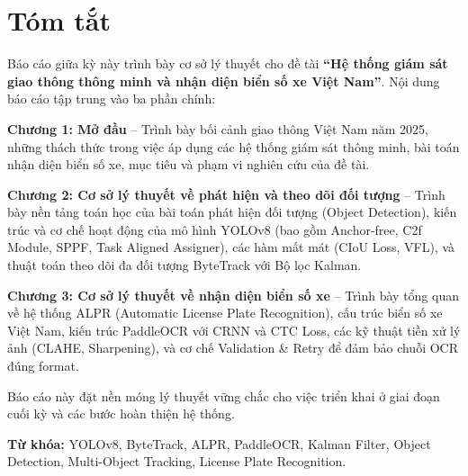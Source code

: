 \chapter*{Tóm tắt}

Báo cáo giữa kỳ này trình bày cơ sở lý thuyết cho đề tài \textbf{``Hệ thống giám sát giao thông thông minh và nhận diện biển số xe Việt Nam''}. Nội dung báo cáo tập trung vào ba phần chính:

\textbf{Chương 1: Mở đầu} -- Trình bày bối cảnh giao thông Việt Nam năm 2025, những thách thức trong việc áp dụng các hệ thống giám sát thông minh, bài toán nhận diện biển số xe, mục tiêu và phạm vi nghiên cứu của đề tài.

\textbf{Chương 2: Cơ sở lý thuyết về phát hiện và theo dõi đối tượng} -- Trình bày nền tảng toán học của bài toán phát hiện đối tượng (Object Detection), kiến trúc và cơ chế hoạt động của mô hình YOLOv8 (bao gồm Anchor-free, C2f Module, SPPF, Task Aligned Assigner), các hàm mất mát (CIoU Loss, VFL), và thuật toán theo dõi đa đối tượng ByteTrack với Bộ lọc Kalman.

\textbf{Chương 3: Cơ sở lý thuyết về nhận diện biển số xe} -- Trình bày tổng quan về hệ thống ALPR (Automatic License Plate Recognition), cấu trúc biển số xe Việt Nam, kiến trúc PaddleOCR với CRNN và CTC Loss, các kỹ thuật tiền xử lý ảnh (CLAHE, Sharpening), và cơ chế Validation \& Retry để đảm bảo chuỗi OCR đúng format.

Báo cáo này đặt nền móng lý thuyết vững chắc cho việc triển khai ở giai đoạn cuối kỳ và các bước hoàn thiện hệ thống.

\vspace{0.5cm}
\textbf{Từ khóa:} YOLOv8, ByteTrack, ALPR, PaddleOCR, Kalman Filter, Object Detection, Multi-Object Tracking, License Plate Recognition.
